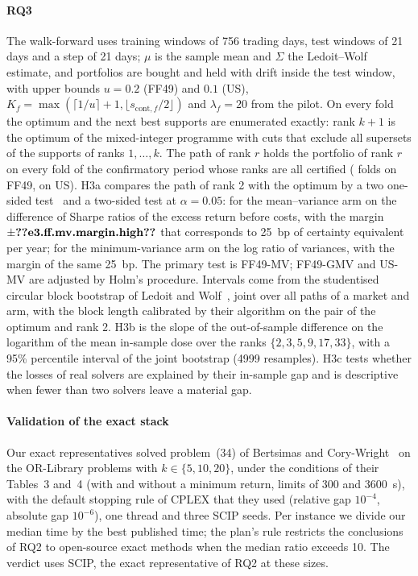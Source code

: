 \paragraph{RQ3} The walk-forward uses training windows of 756 trading days, test windows of 21 days and a step of 21
days; $\mu$ is the sample mean and $\Sigma$ the Ledoit--Wolf estimate, and portfolios are bought and held with drift
inside the test window, with upper bounds $u = 0.2$ (FF49) and $0.1$ (US), $K_f = \max(\lceil 1/u \rceil + 1, \lfloor %
s_{\mathrm{cont},f}/2 \rfloor)$ and $\lambda_f = 20$ from the pilot. On every fold the optimum and the next best supports
are enumerated exactly: rank $k + 1$ is the optimum of the mixed-integer programme with cuts that exclude all supersets
of the supports of ranks $1, \ldots, k$. The path of rank $r$ holds the portfolio of rank $r$ on every fold of the
confirmatory period whose ranks are all certified ( folds on FF49,  on US).
H3a compares the path of rank 2 with the optimum by a two one-sided test~\cite{schuirmann1987comparison} and a
two-sided test at $\alpha = 0.05$: for the mean--variance arm on the difference of Sharpe ratios of the excess return %
before costs, with the margin $\pm\res{e3.ff.mv.margin.high}$ that corresponds to 25~bp of certainty equivalent per %
year; for the minimum-variance arm on the log ratio of variances, with the margin of the same 25~bp. The primary test %
is FF49-MV; FF49-GMV and US-MV are adjusted by Holm's procedure. Intervals come from the studentised circular block
bootstrap of Ledoit and Wolf~\cite{ledoit2008robust}, joint over all paths of a market and arm, with the block length
calibrated by their algorithm on the pair of the optimum and rank 2. H3b is the slope of the out-of-sample difference
on the logarithm of the mean in-sample dose over the ranks $\{2, 3, 5, 9, 17, 33\}$, with a 95\% percentile interval of %
the joint bootstrap (4999 resamples). H3c tests whether the losses of real solvers are explained by their in-sample gap
and is descriptive when fewer than two solvers leave a material gap.

\paragraph{Validation of the exact stack} Our exact representatives solved problem~(34) of Bertsimas and
Cory-Wright~\cite{bertsimas2022scalable} on the OR-Library problems with $k \in \{5, 10, 20\}$, under the conditions of
their Tables~3 and~4 (with and without a minimum return, limits of 300 and 3600~s), with the default stopping rule of
CPLEX that they used (relative gap $10^{-4}$, absolute gap $10^{-6}$), one thread and three SCIP seeds. Per instance we
divide our median time by the best published time; the plan's rule restricts the conclusions of RQ2 to open-source
exact methods when the median ratio exceeds 10. The verdict uses SCIP, the exact representative of RQ2 at these sizes.

